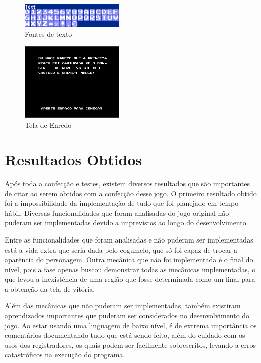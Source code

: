 \documentclass[11pt, twocolumn]{extarticle}
\begin{document}
\begin{figure}[H]
	\centering
	\includegraphics[width=5cm]{figuras/fonte_de_texto.png}
	\caption{Fontes de texto}
	\label{image: Fontes de texto}
\end{figure}

\begin{figure}[H]
	\centering
	\includegraphics[width=5cm]{figuras/tela_enredo.png}
	\caption{Tela de Enredo}
	\label{image: Tela de Enredo}
\end{figure}


\section{Resultados Obtidos}
\indent \indent Após toda a confecção e testes, existem diversos resultados que são importantes de citar ao serem obtidos com a confecção desse jogo. O primeiro resultado obtido foi a impossibilidade da implementação de tudo que foi planejado em tempo hábil. Diversas funcionalidades que foram analisadas do jogo original não puderam ser implementadas devido a imprevistos ao longo do desenvolvimento. 

Entre as funcionalidades que foram analisadas e não puderam ser implementadas está a vida extra que seria dada pelo cogumelo, que só foi capaz de trocar a aparência do personagem. Outra mecânica que não foi implementada é o final do nível, pois a fase apenas buscou demonstrar todas as mecânicas implementadas, o que levou a inexistência de uma região que fosse determinada como um final para a obtenção da tela de vitória.

Além das mecânicas que não puderam ser implementadas, também existiram aprendizados importantes que puderam ser considerados no desenvolvimento do jogo. Ao estar usando uma linguagem de baixo nível, é de extrema importância os comentários documentando tudo que está sendo feito, além do cuidado com os usos dos registradores, os quais podem ser facilmente sobrescritos, levando a erros catastróficos na execução do programa.
\end{document}
